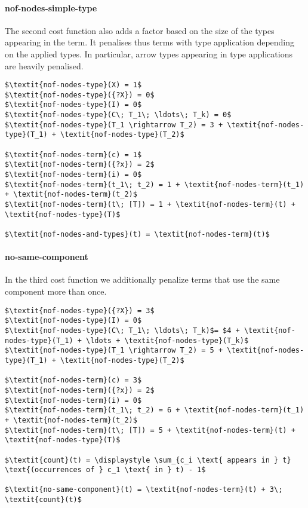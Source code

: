   \paragraph{nof-nodes-simple-type}
The second cost function also adds a factor based on the size of the types appearing in the term. It penalises thus terms with type application depending on the applied types. In particular, arrow types appearing in type applications are heavily penalised.
%
\begin{lstlisting}[style=algorithm]
$\textit{nof-nodes-type}(X) = 1$
$\textit{nof-nodes-type}({?X}) = 0$
$\textit{nof-nodes-type}(I) = 0$
$\textit{nof-nodes-type}(C\; T_1\; \ldots\; T_k) = 0$
$\textit{nof-nodes-type}(T_1 \rightarrow T_2) = 3 + \textit{nof-nodes-type}(T_1) + \textit{nof-nodes-type}(T_2)$

$\textit{nof-nodes-term}(c) = 1$
$\textit{nof-nodes-term}({?x}) = 2$
$\textit{nof-nodes-term}(i) = 0$
$\textit{nof-nodes-term}(t_1\; t_2) = 1 + \textit{nof-nodes-term}(t_1) + \textit{nof-nodes-term}(t_2)$
$\textit{nof-nodes-term}(t\; [T]) = 1 + \textit{nof-nodes-term}(t) + \textit{nof-nodes-type}(T)$

$\textit{nof-nodes-and-types}(t) = \textit{nof-nodes-term}(t)$
\end{lstlisting}

  \paragraph{no-same-component}
In the third cost function we additionally penalize terms that use the same component more than once.
%
\begin{lstlisting}[style=algorithm]
$\textit{nof-nodes-type}({?X}) = 3$
$\textit{nof-nodes-type}(I) = 0$
$\textit{nof-nodes-type}(C\; T_1\; \ldots\; T_k)$= $4 + \textit{nof-nodes-type}(T_1) + \ldots + \textit{nof-nodes-type}(T_k)$
$\textit{nof-nodes-type}(T_1 \rightarrow T_2) = 5 + \textit{nof-nodes-type}(T_1) + \textit{nof-nodes-type}(T_2)$

$\textit{nof-nodes-term}(c) = 3$
$\textit{nof-nodes-term}({?x}) = 2$
$\textit{nof-nodes-term}(i) = 0$
$\textit{nof-nodes-term}(t_1\; t_2) = 6 + \textit{nof-nodes-term}(t_1) + \textit{nof-nodes-term}(t_2)$
$\textit{nof-nodes-term}(t\; [T]) = 5 + \textit{nof-nodes-term}(t) + \textit{nof-nodes-type}(T)$

$\textit{count}(t) = \displaystyle \sum_{c_i \text{ appears in } t} \text{(occurrences of } c_1 \text{ in } t) - 1$

$\textit{no-same-component}(t) = \textit{nof-nodes-term}(t) + 3\; \textit{count}(t)$
\end{lstlisting}

